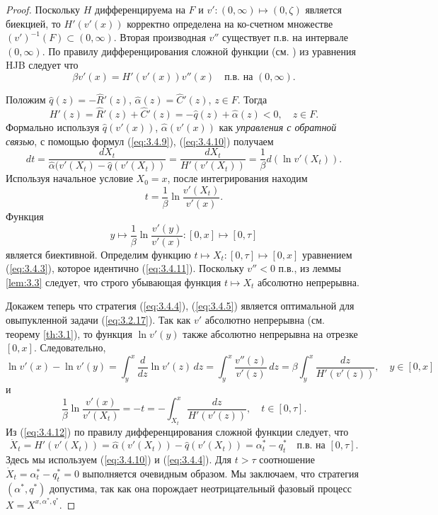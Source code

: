 \begin{proof}
Поскольку $H$ дифференцируема на $F$ и $v':(0,\infty)\mapsto (0,\zeta)$ является биекцией, то $H'(v'(x))$ корректно определена на ко-счетном множестве $(v')^{-1}(F)\subset (0,\infty)$. Вторая производная $v''$ существует п.в. на интервале $(0,\infty)$. По правилу дифференцирования сложной функции (см. \cite[следствие 3.48]{Leo09}) из уравнения HJB следует что
\begin{equation} \label{eq:3.4.9}
 \beta v'(x)=H'(v'(x))v''(x)\quad\textrm{п.в. на } (0,\infty).
\end{equation}

Положим $\widehat q(z)=-\widehat R'(z)$, $\widehat\alpha(z)=\widehat C'(z)$, $z\in F$. Тогда
\begin{equation} \label{eq:3.4.10}
 H'(z)=\widehat R'(z)+\widehat C'(z)=-\widehat q(z)+\widehat\alpha(z)<0,\quad z\in F.
\end{equation}
Формально используя $\widehat q(v'(x))$, $\widehat\alpha(v'(x))$ как \emph{управления с обратной связью}, с помощью формул (\ref{eq:3.4.9}), (\ref{eq:3.4.10}) получаем
$$ dt=\frac{d X_t}{\widehat\alpha(v'(X_t)-\widehat q(v'(X_t))}=\frac{dX_t}{H'(v'(X_t))}=\frac{1}{\beta}d (\ln v'(X_t)). $$
Используя начальное условие $X_0=x$, после интегрирования находим
\begin{equation} \label{eq:3.4.11}
 t=\frac{1}{\beta}\ln\frac{v'(X_t)}{v'(x)}.
\end{equation}
Функция
$$ y\mapsto\frac{1}{\beta}\ln\frac{v'(y)}{v'(x)}:[0,x]\mapsto [0,\tau]$$
является биективной. Определим функцию $t\mapsto X_t:[0,\tau]\mapsto[0,x]$ уравнением (\ref{eq:3.4.3}), которое идентично (\ref{eq:3.4.11}). Поскольку $v''<0$ п.в., из леммы \ref{lem:3.3} следует, что строго убывающая функция $t\mapsto X_t$ абсолютно непрерывна.

Докажем теперь что стратегия (\ref{eq:3.4.4}), (\ref{eq:3.4.5}) является оптимальной для овыпукленной задачи (\ref{eq:3.2.17}).
Так как $v'$ абсолютно непрерывна (см. теорему \ref{th:3.1}), то функция $\ln v'(y)$ также абсолютно непрерывна на отрезке $[0,x]$. Следовательно,
$$ \ln v'(x)-\ln v'(y)=\int_y^x\frac{d}{dz}\ln v'(z)\,dz=\int_y^x\frac{v''(z)}{v'(z)}\,dz=\beta\int_y^x\frac{dz}{H'(v'(z))}, \quad y\in [0,x]$$
и
\begin{equation} \label{eq:3.4.12}
\frac{1}{\beta}\ln\frac{v'(x)}{v'(X_t)}=-t=-\int_{X_t}^x\frac{dz}{H'(v'(z))},\quad t\in [0,\tau].
\end{equation}
Из (\ref{eq:3.4.12}) по правилу дифференцирования сложной функции \cite[следствие 3.48]{Leo09} следует, что
$$\dot X_t=H'(v'(X_t))=\widehat\alpha(v'(X_t))-\widehat q(v'(X_t))=\alpha^*_t-q^*_t\quad\textrm{п.в. на } [0,\tau].$$
Здесь мы используем (\ref{eq:3.4.10}) и (\ref{eq:3.4.4}).
Для $t>\tau$ соотношение $\dot X_t=\alpha^*_t-q^*_t=0$ выполняется очевидным образом. Мы заключаем, что стратегия $(\alpha^*,q^*)$ допустима, так как она порождает неотрицательный фазовый процесс $X=X^{x,\alpha^*,q^*}$.


\end{proof}
